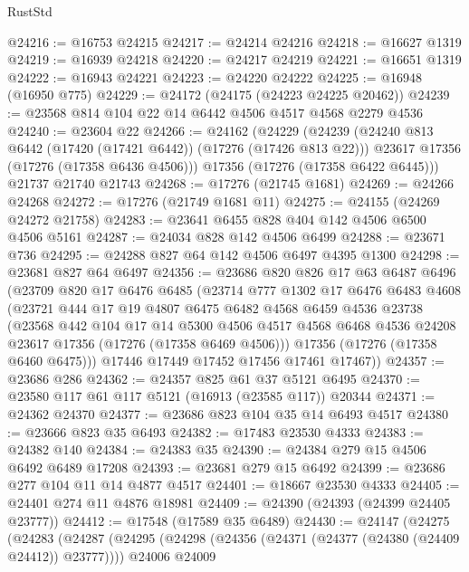 \begin{lexlean}{RustStd}
\begin{coremodule}
@24216 := @16753 @24215
@24217 := @24214 @24216
@24218 := @16627 @1319
@24219 := @16939 @24218
@24220 := @24217 @24219
@24221 := @16651 @1319
@24222 := @16943 @24221
@24223 := @24220 @24222
@24225 := @16948 (@16950 @775)
@24229 := @24172 (@24175 (@24223 @24225 @20462))
@24239 := @23568 @814 @104 @22 @14 @6442 @4506 @4517 @4568 @2279 @4536
@24240 := @23604 @22
@24266 := @24162
    (@24229
      (@24239
        (@24240 @813 @6442 (@17420 (@17421 @6442)) (@17276 (@17426 @813 @22)))
        @23617
        @17356
        (@17276 (@17358 @6436 @4506)))
      @17356
      (@17276 (@17358 @6422 @6445)))
    @21737
    @21740
    @21743
@24268 := @17276 (@21745 @1681)
@24269 := @24266 @24268
@24272 := @17276 (@21749 @1681 @11)
@24275 := @24155 (@24269 @24272 @21758)
@24283 := @23641 @6455 @828 @404 @142 @4506 @6500 @4506 @5161
@24287 := @24034 @828 @142 @4506 @6499
@24288 := @23671 @736
@24295 := @24288 @827 @64 @142 @4506 @6497 @4395 @1300
@24298 := @23681 @827 @64 @6497
@24356 := @23686
    @820
    @826
    @17
    @63
    @6487
    @6496
    (@23709
      @820
      @17
      @6476
      @6485
      (@23714
        @777
        @1302
        @17
        @6476
        @6483
        @4608
        (@23721
          @444
          @17
          @19
          @4807
          @6475
          @6482
          @4568
          @6459
          @4536
          @23738
          (@23568
            @442
            @104
            @17
            @14
            @5300
            @4506
            @4517
            @4568
            @6468
            @4536
            @24208
            @23617
            @17356
            (@17276 (@17358 @6469 @4506)))
          @17356
          (@17276 (@17358 @6460 @6475)))
        @17446
        @17449
        @17452
        @17456
        @17461
        @17467))
@24357 := @23686 @286
@24362 := @24357 @825 @61 @37 @5121 @6495
@24370 := @23580 @117 @61 @117 @5121 (@16913 (@23585 @117)) @20344
@24371 := @24362 @24370
@24377 := @23686 @823 @104 @35 @14 @6493 @4517
@24380 := @23666 @823 @35 @6493
@24382 := @17483 @23530 @4333
@24383 := @24382 @140
@24384 := @24383 @35
@24390 := @24384 @279 @15 @4506 @6492 @6489 @17208
@24393 := @23681 @279 @15 @6492
@24399 := @23686 @277 @104 @11 @14 @4877 @4517
@24401 := @18667 @23530 @4333
@24405 := @24401 @274 @11 @4876 @18981
@24409 := @24390 (@24393 (@24399 @24405 @23777))
@24412 := @17548 (@17589 @35 @6489)
@24430 := @24147
    (@24275
      (@24283
        (@24287
          (@24295
            (@24298 (@24356 (@24371 (@24377 (@24380 (@24409 @24412)) @23777))))
            @24006
            @24009

\end{coremodule}
\end{lexlean}
